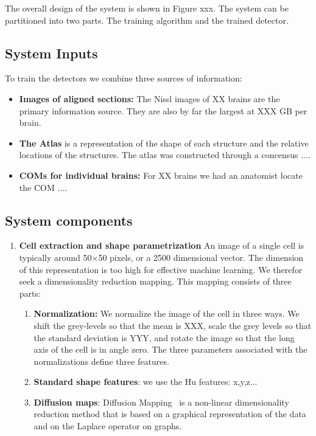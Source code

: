 \documentclass[runningheads]{llncs}
\begin{document}
The overall design of the system is shown in Figure xxx. The system can be partitioned into two parts. The training algorithm and the trained detector.

\subsection{System Inputs}
To train the detectors we combine three sources of information:
\begin{itemize}
    \item {\bf Images of aligned sections:} The Nissl images of XX brains are the primary information source. They are also by far the largest at XXX GB per brain.
    \item {\bf The Atlas} is a representation of the shape of each structure and the relative locations of the structures. The atlas was constructed through a concensus ....
    \item {\bf COMs for individual brains:} For XX brains we had an anatomist locate the COM ....
\end{itemize}

\subsection{System components}

\begin{enumerate}
\item{\bf Cell extraction and shape parametrization}
An image of a single cell is typically around 50$\times$50 pixels, or a 2500 dimensional vector. The dimension of this representation is too high for effective machine learning. We therefor seek a dimensionality reduction mapping. This mapping consists of three parts:
\begin{enumerate}
    \item {\bf Normalization:} We normalize the image of the cell in three ways. We 
    shift the grey-levels so that the mean is XXX, scale the grey levels so that the standard deviation is YYY, and rotate the image so that the long axis of the cell is in angle zero. The three parameters associated with the normalizations define three features.
    \item {\bf Standard shape features}: we use the Hu features: x,y,z...
    \item{ \bf Diffusion maps}: Diffusion
      Mapping~\cite{belkin2003,coifman2005geometric} is a non-linear
      dimensionality reduction method that is based on a graphical
      representation of the data and on the Laplace operator on
      graphs.
      \end{enumerate}
\end{enumerate}
\end{document}

